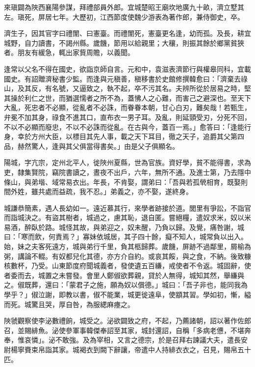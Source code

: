 \begin{pinyinscope}
 來瑱闢為陜西襄陽參謀，拜禮部員外郎。宜城楚昭王廟坎地廣九十畝，濟立墅其左。瑱死，屏居七年。大歷初，江西節度使魏少游表為著作郎，兼侍御史，卒。



 濟生子，因其官字曰禮闈、曰憲臺。而禮闈死，憲臺更名逢，幼而孤。及長，耕宜城野，自力讀書，不謁州縣。歲饑，節用以給親里；大穰，則振其餘於鄉黨貧狹者。朋友有緩急，輒出家貲周贍，以義聞。



 逢常以父名不得在國史，欲詣京師自言。元和中，袁滋表濟節行與權皋同科，宜載國史。有詔贈濟秘書少監。而逢與元稹善，稹移書於史館修撰韓愈曰：「濟棄去祿山，及其反，有名號，又逼致之，執不起，卒不污其名。夫辨所從於居易之時，堅其操於利仁之世，而猶選懦者之所不為，蓋怫人之心難，而害己之避深也。至天下大亂，死忠者不必顯，從亂者不必誅，而眷眷本朝，甘心白刃，難矣哉！若甄生，弁冕不加其身，祿食不進其口，直布衣一男子耳。及亂，則延頸受刃，分死不回，不以不必顯而廢忠，不以不必誅而從亂。在古與今，蓋百一焉。」愈答曰：「逢能行身，幸於方州大臣，以標目其先人事，載之天下耳目，徹之天子，追爵其父第四品，赫然驚人，逢與其父俱當得書矣。」由是父子俱顯名。



 陽城，字亢宗，定州北平人，徙陜州夏縣，世為官族。資好學，貧不能得書，求為吏，隸集賢院，竊院書讀之，晝夜不出戶，六年，無所不通。及進士第，乃去隱中條山，與弟堦、域常易衣出。年長，不肯娶，謂弟曰：「吾與若孤煢相育，既娶則間外姓，雖共處而益疏，我不忍。」弟義之，亦不娶，遂終身。



 城謙恭簡素，遇人長幼如一。遠近慕其行，來學者跡接於道。閭里有爭訟，不詣官而詣城決之。有盜其樹者，城過之，慮其恥，退自匿。嘗絕糧，遣奴求米，奴以米易酒，醉臥於路。城怪其故，與弟迎之，奴未醒，乃負以歸。及覺，痛咎謝，城曰：「寒而飲，何責焉？」寡妹依城居，其子四十餘，癡不知人，城常負以出入。始，妹之夫客死遠方，城與弟行千里，負其柩歸葬。歲饑，屏跡不過鄰里，屑榆為粥，講論不輟。有奴都兒化其德，亦方介自約。或哀其餒，與之食，不納。後致糠核數杯，乃受。山東節度府聞城義者，發使遺五百縑，戒使者不令返。城固辭，使者委而去，城置之未嘗發。會里人鄭俶欲葬親，貸於人無得，城知其然，舉縑與之。俶既葬，還曰：「蒙君子之施，願為奴以償德。」城曰：「吾子非也，能同我為學乎？」俶泣謝，即教以書，俶不能業，城更徙遠阜，使顓其習。學如初，慚，縊而死。城驚且哭，厚自咎，為服緦麻瘞之。



 陜虢觀察使李泌數禮餉，城受之。泌欲闢致之府，不起，乃薦諸朝，詔以著作佐郎召，並賜緋魚。泌使參軍事韓傑奉詔至其家，城封還詔，自稱「多病老憊，不堪奔奉，惟哀憐」。泌不敢強。及為宰相，又言之德宗，於是召拜右諫議大夫，遣長安尉楊寧賚束帛詣其家。城褐衣到闕下辭讓，帝遣中人持緋衣衣之，召見，賜帛五十匹。




\end{pinyinscope}
